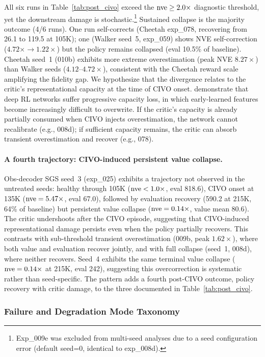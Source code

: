 All six runs in Table~\ref{tab:post_civo} exceed the $\mathrm{nve} \geq 2.0\times$ diagnostic threshold, yet the downstream damage is stochastic.\footnote{Exp\_009e was excluded from multi-seed analyses due to a seed configuration error (default seed=0, identical to exp\_008d).}  Sustained collapse is the majority outcome (4/6 runs). One run self-corrects (Cheetah exp\_078, recovering from 26.1 to 119.5 at 105K); one (Walker seed~5, exp\_059) shows NVE self-correction ($4.72\times \to 1.22\times$) but the policy remains collapsed (eval 10.5\% of baseline). Cheetah seed~1 (010b) exhibits more extreme overestimation (peak NVE $8.27\times$) than Walker seeds ($4.12$--$4.72\times$), consistent with the Cheetah reward scale amplifying the fidelity gap.  We hypothesize that the divergence relates to the critic's representational capacity at the time of CIVO onset.  \citet{lyle2022capacity} demonstrate that deep RL networks suffer progressive capacity loss, in which early-learned features become increasingly difficult to overwrite.  If the critic's capacity is already partially consumed when CIVO injects overestimation, the network cannot recalibrate (e.g., 008d); if sufficient capacity remains, the critic can absorb transient overestimation and recover (e.g., 078).

\paragraph{A fourth trajectory: CIVO-induced persistent value collapse.}
Obs-decoder SGS seed~3 (exp\_025) exhibits a trajectory not observed in the untreated seeds: healthy through 105K ($\mathrm{nve} < 1.0\times$, eval 818.6), CIVO onset at 135K ($\mathrm{nve} = 5.47\times$, eval 67.0), followed by evaluation recovery (590.2 at 215K, 64\% of baseline) but persistent value collapse ($\mathrm{nve} = 0.14\times$, value mean 80.6). The critic undershoots after the CIVO episode, suggesting that CIVO-induced representational damage persists even when the policy partially recovers. This contrasts with sub-threshold transient overestimation (009b, peak $1.62\times$), where both value and evaluation recover jointly, and with full collapse (seed~1, 008d), where neither recovers. Seed~4 exhibits the same terminal value collapse ($\mathrm{nve} = 0.14\times$ at 215K, eval 242), suggesting this overcorrection is systematic rather than seed-specific. The pattern adds a fourth post-CIVO outcome, policy recovery with critic damage, to the three documented in Table~\ref{tab:post_civo}.

\subsubsection{Failure and Degradation Mode Taxonomy}

